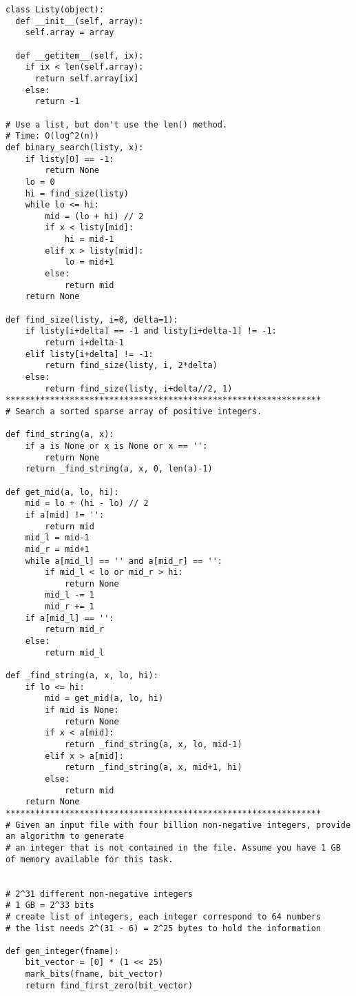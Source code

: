 \documentclass[12pt]{article}
\begin{document}
\begin{lstlisting}
class Listy(object):
  def __init__(self, array):
    self.array = array
  
  def __getitem__(self, ix):
    if ix < len(self.array):
      return self.array[ix]
    else:
      return -1

# Use a list, but don't use the len() method.
# Time: O(log^2(n))
def binary_search(listy, x):
    if listy[0] == -1:
        return None
    lo = 0
    hi = find_size(listy)
    while lo <= hi:
        mid = (lo + hi) // 2
        if x < listy[mid]:
            hi = mid-1
        elif x > listy[mid]:
            lo = mid+1
        else:
            return mid
    return None

def find_size(listy, i=0, delta=1):
    if listy[i+delta] == -1 and listy[i+delta-1] != -1:
        return i+delta-1
    elif listy[i+delta] != -1:
        return find_size(listy, i, 2*delta)
    else:
        return find_size(listy, i+delta//2, 1)
****************************************************************
# Search a sorted sparse array of positive integers.

def find_string(a, x):
    if a is None or x is None or x == '':
        return None
    return _find_string(a, x, 0, len(a)-1)

def get_mid(a, lo, hi):
    mid = lo + (hi - lo) // 2
    if a[mid] != '':
        return mid
    mid_l = mid-1
    mid_r = mid+1
    while a[mid_l] == '' and a[mid_r] == '':
        if mid_l < lo or mid_r > hi:
            return None
        mid_l -= 1
        mid_r += 1
    if a[mid_l] == '':
        return mid_r
    else:
        return mid_l

def _find_string(a, x, lo, hi):
    if lo <= hi:
        mid = get_mid(a, lo, hi)
        if mid is None:
            return None
        if x < a[mid]:
            return _find_string(a, x, lo, mid-1)
        elif x > a[mid]:
            return _find_string(a, x, mid+1, hi)
        else:
            return mid
    return None
****************************************************************
# Given an input file with four billion non-negative integers, provide an algorithm to generate
# an integer that is not contained in the file. Assume you have 1 GB of memory available for this task.


# 2^31 different non-negative integers
# 1 GB = 2^33 bits
# create list of integers, each integer correspond to 64 numbers
# the list needs 2^(31 - 6) = 2^25 bytes to hold the information

def gen_integer(fname):
    bit_vector = [0] * (1 << 25)
    mark_bits(fname, bit_vector)
    return find_first_zero(bit_vector)


\end{lstlisting}
\end{document}
